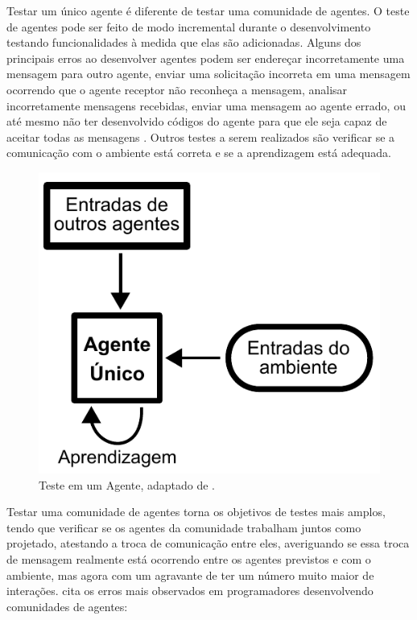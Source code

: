 Testar um único agente é diferente de testar uma comunidade de agentes. O teste de agentes pode ser feito de modo incremental durante o desenvolvimento testando funcionalidades à medida que elas são adicionadas. Alguns dos principais erros ao desenvolver agentes podem ser endereçar incorretamente uma mensagem para outro agente, enviar uma solicitação incorreta em uma mensagem ocorrendo que o agente receptor não reconheça a mensagem, analisar incorretamente mensagens recebidas, enviar uma mensagem ao agente errado, ou até mesmo não ter desenvolvido códigos do agente para que ele seja capaz de aceitar todas as mensagens \cite{rouff2002test}. Outros testes a serem realizados são verificar se a comunicação com o ambiente está correta e se a aprendizagem está adequada.

\begin{figure}[ht]
\centering
\includegraphics[scale=0.7]{imagens/single_agent.pdf}
\caption{Teste em um Agente, adaptado de \cite{rouff2002test}.}
\label{single}
\end{figure}

Testar uma comunidade de agentes torna os objetivos de testes mais amplos, tendo que verificar se os agentes da comunidade trabalham juntos como projetado, atestando a troca de comunicação entre eles, averiguando se essa troca de mensagem realmente está ocorrendo entre os agentes previstos  e  com o ambiente, mas agora com um agravante de ter um número muito maior de interações. \cite{rouff2002test} cita os erros mais observados em programadores desenvolvendo comunidades de agentes:

